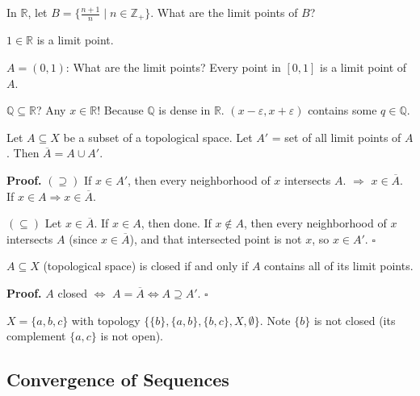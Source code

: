 \documentclass[11pt]{report}
\renewenvironment{proof}[1][Proof]{\noindent\textbf{#1.} }{\hfill$\square$\par\vspace{5pt}}
\begin{document}
\begin{exbox}
In $\mathbb{R}$, let $B = \{\frac{n+1}{n} \mid n \in \mathbb{Z}_+\}$. What are the limit points of $B$?

$1 \in \mathbb{R}$ is a limit point.
\end{exbox}

\begin{exbox}
$A = (0,1)$: What are the limit points? Every point in $[0,1]$ is a limit point of $A$.
\end{exbox}

\begin{exbox}
$\mathbb{Q} \subseteq \mathbb{R}$? Any $x \in \mathbb{R}$! Because $\mathbb{Q}$ is dense in $\mathbb{R}$. $(x - \varepsilon, x + \varepsilon)$ contains some $q \in \mathbb{Q}$.
\end{exbox}

\begin{thmbox}
Let $A \subseteq X$ be a subset of a topological space. Let $A'$ = set of all limit points of $A$. Then $\overline{A} = A \cup A'$.
\end{thmbox}

\begin{proof}
$(\supseteq)$ If $x \in A'$, then every neighborhood of $x$ intersects $A$. $\Rightarrow$ $x \in \overline{A}$. If $x \in A \Rightarrow x \in \overline{A}$. \checkmark

$(\subseteq)$ Let $x \in \overline{A}$. If $x \in A$, then done. If $x \notin A$, then every neighborhood of $x$ intersects $A$ (since $x \in \overline{A}$), and that intersected point is not $x$, so $x \in A'$. \checkmark
\end{proof}

\begin{corbox}
$A \subseteq X$ (topological space) is closed if and only if $A$ contains all of its limit points.
\end{corbox}

\begin{proof}
$A$ closed $\Leftrightarrow$ $A = \overline{A} \Leftrightarrow A \supseteq A'$.
\end{proof}

\begin{exbox}
$X = \{a, b, c\}$ with topology $\{\{b\}, \{a,b\}, \{b,c\}, X, \emptyset\}$. Note $\{b\}$ is not closed (its complement $\{a,c\}$ is not open).
\end{exbox}

\subsection{Convergence of Sequences}
\end{document}
